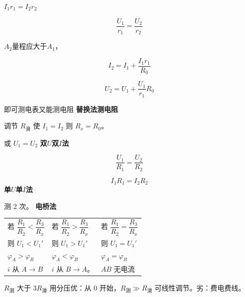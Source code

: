 $I_1r_1=I_2r_2$


\[\frac{U_1}{r_1}=\frac{U_2}{r_2}\]


$A_2$量程应大于$A_1$，

\[I_2=I_1+\frac{I_1r_1}{R_0}\]


\[U_2=U_1+\frac{U_1}{r_1}R_0\]

即可测电表又能测电阻 %
\textbf{替换法测电阻}


调节 $R_{\text{滑}}$ 使 $I_1=I_2$ 则 $R_x=R_0$。

\hspace{2em}或 $U_1=U_2$
\textbf{双$U$双$I$法}


\[\frac{U_1}{R_1}=\frac{U_2}{R_2}\]


\[I_1R_1=I_2R_2\]
\textbf{单$U$单$I$法}


测 2 次。
\textbf{电桥法}


\begin{center}
\renewcommand{\arraystretch}{2.0}
\begin{tabular}{@{}lll@{}}
若 $\dfrac{R_1}{R_2}<\dfrac{R_3}{R_x}$ & 若 $\dfrac{R_1}{R_2}>\dfrac{R_3}{R_x}$ & 若 $\dfrac{R_1}{R_2}=\dfrac{R_3}{R_x}$\\
则 $U_1<U_1'$ & 则 $U_1>U_1'$ & 则 $U_1=U_1'$\\
$\varphi_A>\varphi_B$ & $\varphi_A<\varphi_B$ & $\varphi_A=\varphi_B$\\
$i$ 从 $A\to B$ & $i$ 从 $B\to A$。 & $AB$ 无电流
\end{tabular}
\end{center}
$R_{\text{测}}$ 大于 $3R_{\text{滑}}$ 用分压\quad 优：从 $0$ 开始，$R_{\text{测}}\gg R_{\text{滑}}$ 可线性调节。\quad 劣：费电费线。

